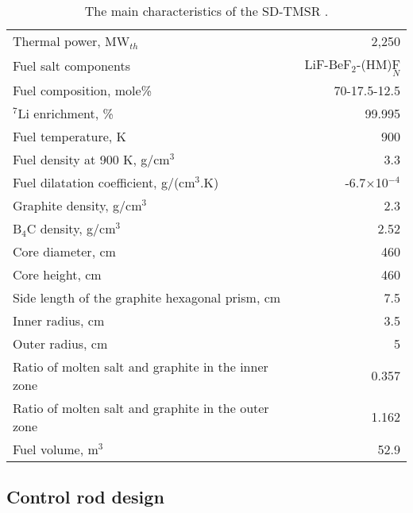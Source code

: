 \begin{table}  %
	\caption{The main characteristics of the SD-TMSR \cite{li_optimization_2018,ashraf2020whole}.}
	\vspace{0.1in}
	\begin{tabularx}{\textwidth}{l | r}
		\hline
		Thermal power, MW$_{th}$          				&  2,250  \\ 
		Fuel salt components                            & LiF-BeF$_2$-(\gls{HM})F$_N$ \\
		Fuel composition, mole\%                        & 70-17.5-12.5    \\
		$^7$Li enrichment, \%        				& 99.995   \\
		Fuel temperature, K 							& 900  \\
		Fuel density at 900 K, g/cm$^3$		  		& 3.3 \\
		Fuel dilatation coefficient, g/(cm$^3$$.$K)  &  -6.7$\times$10$^{-4}$ \\
		Graphite density, g/cm$^3$             	    & 2.3	\\ 
		B$_4$C density, g/cm$^3$					& 2.52  \\ 
		Core diameter, cm								& 460  \\
		Core height, cm									& 460  \\
		Side length of the graphite hexagonal prism, cm   & 7.5 \\
		Inner radius, cm							& 3.5  \\
		Outer radius, cm							& 5  \\
		Ratio of molten salt and graphite in the inner zone	&  0.357  \\
		Ratio of molten salt and graphite in the outer zone &  1.162  \\
		Fuel volume, m$^3$  &	52.9 \\
		\hline
	\end{tabularx}
	\label{tab:table1}
\end{table}


\subsection{Control rod design} \label{CRD}


